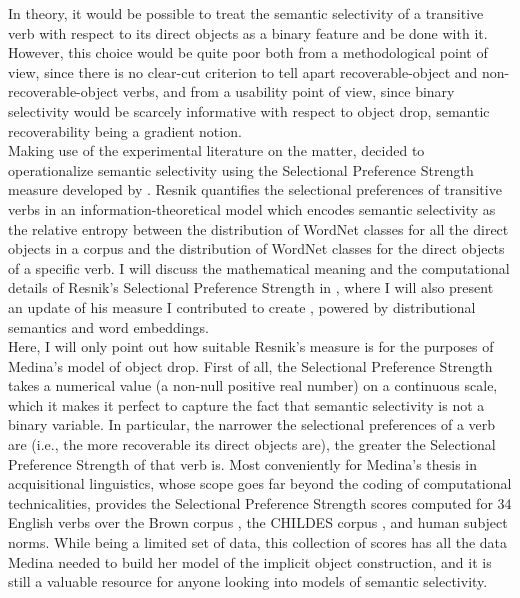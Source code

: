 In theory, it would be possible to treat the semantic selectivity of a transitive verb with respect to its direct objects as a binary feature and be done with it. However, this choice would be quite poor both from a methodological point of view, since there is no clear-cut criterion to tell apart recoverable-object and non-recoverable-object verbs, and from a usability point of view, since binary selectivity would be scarcely informative with respect to object drop, semantic recoverability being a gradient notion.\\
Making use of the experimental literature on the matter, \textcite{Medina2007} decided to operationalize semantic selectivity using the Selectional Preference Strength measure developed by \textcite{Resnik1993, Resnik1996}. Resnik quantifies the selectional preferences of transitive verbs in an information-theoretical model which encodes semantic selectivity as the relative entropy between the distribution of WordNet \parencite{beckwith1991wordnet, Miller1995} classes for all the direct objects in a corpus and the distribution of WordNet classes for the direct objects of a specific verb. I will discuss the mathematical meaning and the computational details of Resnik's Selectional Preference Strength in , where I will also present an update of his measure I contributed to create \parencite{CappelliLenciPISA}, powered by distributional semantics and word embeddings.\\
Here, I will only point out how suitable Resnik's measure is for the purposes of Medina's model of object drop. First of all, the Selectional Preference Strength takes a numerical value (a non-null positive real number) on a continuous scale, which it makes it perfect to capture the fact that semantic selectivity is not a binary variable. In particular, the narrower the selectional preferences of a verb are (i.e., the more recoverable its direct objects are), the greater the Selectional Preference Strength of that verb is. Most conveniently for Medina's thesis in acquisitional linguistics, whose scope goes far beyond the coding of computational technicalities, \textcite[150]{Resnik1996} provides the Selectional Preference Strength scores computed for 34 English verbs over the Brown corpus \parencite{kucera1967brownCorpus}, the CHILDES corpus \parencite{macwhinney2000childesCorpus}, and human subject norms. While being a limited set of data, this collection of scores has all the data Medina needed to build her model of the implicit object construction, and it is still a valuable resource for anyone looking into models of semantic selectivity.


